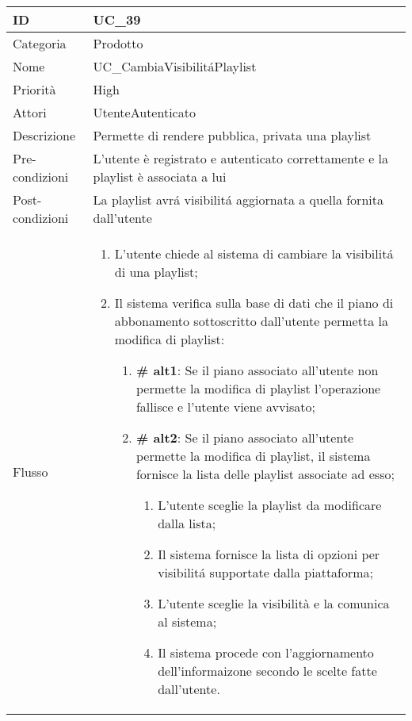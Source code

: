 \begin{center}
\begin{tabular}{ |p{2cm}|p{13cm}|  }
\hline
ID & UC\_39\\\hline
Categoria & Prodotto \\\hline
Nome & UC\_CambiaVisibilit\'aPlaylist\\\hline
Priorità & High \\\hline
Attori &  UtenteAutenticato \\\hline
Descrizione & Permette di rendere pubblica, privata una playlist\\\hline
Pre-condizioni & L'utente è registrato e autenticato correttamente e la playlist è associata a lui\\\hline
Post-condizioni & La playlist avr\'a visibilit\'a aggiornata a quella fornita dall'utente\\\hline
Flusso &  	\begin{enumerate}
		\item L'utente chiede al sistema di cambiare la visibilit\'a di una playlist;
		\item Il sistema verifica sulla base di dati che il piano di abbonamento sottoscritto dall'utente permetta la modifica di playlist:
		 \begin{enumerate}[label*=\arabic*.]
			\item \textbf{\# alt1}: Se il piano associato all'utente non permette la modifica di playlist l'operazione fallisce e l'utente viene avvisato;
			\item \textbf{\# alt2}: Se il piano associato all'utente permette la modifica di playlist, il sistema  fornisce la lista delle playlist associate ad esso;
			\begin{enumerate}[label*=\arabic*.]
				\item L'utente sceglie la playlist da modificare dalla lista;
				\item Il sistema fornisce la lista di opzioni per visibilit\'a supportate dalla piattaforma;
				\item L'utente sceglie la visibilità e la comunica al sistema;
				\item Il sistema procede con l'aggiornamento dell'informaizone secondo le scelte fatte dall'utente.
			\end{enumerate}
		\end{enumerate}
		\end{enumerate}\\\hline
\end{tabular}
\label{table_use_case:39}\newline


\end{center}
